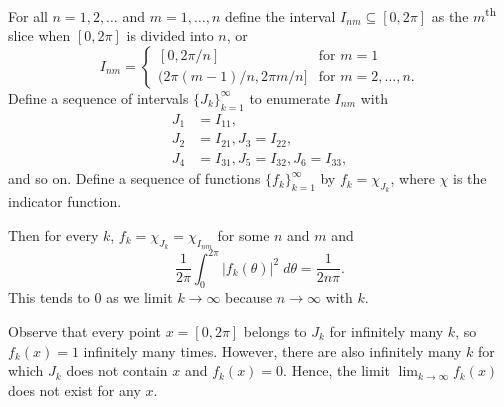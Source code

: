 \documentclass[oneside]{article}
\newcommand\abs[1]{\left|#1\right|}
\begin{document}
  For all $n = 1, 2, \dots$ and $m = 1, \dots, n$ define the interval $I_{nm} \subseteq [0, 2\pi]$ as the $m$\textsuperscript{th} slice when $[0, 2\pi]$ is divided into $n$, or \[
    I_{nm} = \begin{cases}
      [0, 2\pi/n] &\text{for }m=1 \\
      (2\pi (m-1)/n, 2\pi m/n] &\text{for }m=2, \dots, n \text{.}
    \end{cases}
  \] Define a sequence of intervals $\{J_k\}_{k=1}^\infty$ to enumerate $I_{nm}$ with \begin{align*}
    J_1 &= I_{11}, \\
    J_2 &= I_{21},
    J_3 = I_{22}, \\
    J_4 &= I_{31},
    J_5 = I_{32},
    J_6 = I_{33},
  \end{align*} and so on. Define a sequence of functions $\{f_k\}_{k=1}^\infty$ by $f_k = \chi_{J_k}$, where $\chi$ is the indicator function.

  Then for every $k$, $f_k = \chi_{J_k} = \chi_{I_{nm}}$ for some $n$ and $m$ and \[
    \frac{1}{2\pi} \int_0^{2\pi} \abs{f_k(\theta)}^2\;d\theta
    = \frac{1}{2 n \pi} \text{.}
  \] This tends to $0$ as we limit $k \to \infty$ because $n \to \infty$ with $k$.

  Observe that every point $x = [0, 2\pi]$ belongs to $J_k$ for infinitely many $k$, so $f_k(x) = 1$ infinitely many times. However, there are also infinitely many $k$ for which $J_k$ does not contain $x$ and $f_k(x) = 0$. Hence, the limit $\lim_{k\to\infty} f_k(x)$ does not exist for any $x$.
\end{document}
